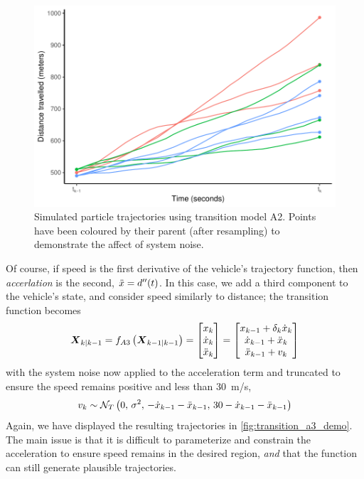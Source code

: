 \begin{knitrout}
\color{fgcolor}\begin{figure}

{\centering \includegraphics[width=.8\textwidth]{figure/transition_a2_demo-1} 

}

\caption[Simulated particle trajectories using transition model A2]{Simulated particle trajectories using transition model A2. Points have been coloured by their parent (after resampling) to demonstrate the affect of system noise.}\label{fig:transition_a2_demo}
\end{figure}


\end{knitrout}


Of course, if speed is the first derivative of the vehicle's trajectory function, then \emph{accerlation} is the second, $\ddot x = d''(t)$. In this case, we add a third component to the vehicle's state, and consider speed similarly to distance; the transition function becomes
\begin{equation}
\label{eq:vehicle_model_newton_accel}
\boldsymbol{X}_{k|k-1} = f_{A3}\left(\boldsymbol{X}_{k-1|k-1}\right) =
\begin{bmatrix}
x_k \\ \dot x_k \\ \ddot x_k
\end{bmatrix} =
\begin{bmatrix}
x_{k-1} + \delta_k\dot x_k \\
\dot x_{k-1} + \ddot x_k \\
\ddot x_{k-1} + v_k
\end{bmatrix}
\end{equation}
with the system noise now applied to the acceleration term and truncated to ensure the speed remains positive and less than 30~m/s,
\begin{equation}
\label{eq:vehicle_model_accel_dist}
v_k \sim \mathcal{N}_T\left(0,\, \sigma^2,\, -\dot x_{k-1} - \ddot x_{k-1},\, 30 - \dot x_{k-1} - \ddot x_{k-1}\right)
\end{equation}
Again, we have displayed the resulting trajectories in \cref{fig:transition_a3_demo}. The main issue is that it is difficult to parameterize and constrain the acceleration to ensure speed remains in the desired region, \emph{and} that the function can still generate plausible trajectories.



